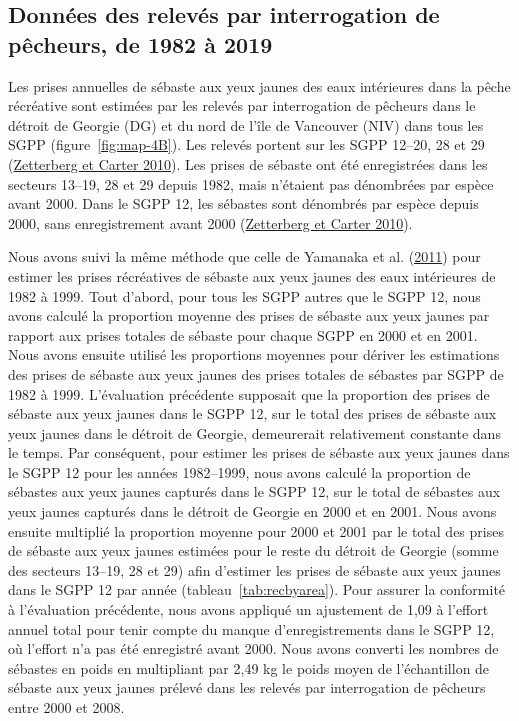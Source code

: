 \documentclass[french,11pt]{book}
\begin{document}
\hypertarget{sec:creel-catch-data}{%
\subsection{Données des relevés par interrogation de pêcheurs, de 1982 à 2019}\label{sec:creel-catch-data}}

Les prises annuelles de sébaste aux yeux jaunes des eaux intérieures dans la pêche récréative sont estimées par les relevés par interrogation de pêcheurs dans le détroit de Georgie (DG) et du nord de l'île de Vancouver (NIV) dans tous les SGPP (figure~\ref{fig:map-4B}). Les relevés portent sur les SGPP 12--20, 28 et 29 (\protect\hyperlink{ref-zetterberg2010}{Zetterberg et Carter 2010}). Les prises de sébaste ont été enregistrées dans les secteurs 13--19, 28 et 29 depuis 1982, mais n'étaient pas dénombrées par espèce avant 2000. Dans le SGPP 12, les sébastes sont dénombrés par espèce depuis 2000, sans enregistrement avant 2000 (\protect\hyperlink{ref-zetterberg2010}{Zetterberg et Carter 2010}).

Nous avons suivi la même méthode que celle de Yamanaka et al. (\protect\hyperlink{ref-yamanaka2011}{2011}) pour estimer les prises récréatives de sébaste aux yeux jaunes des eaux intérieures de 1982 à 1999. Tout d'abord, pour tous les SGPP autres que le SGPP 12, nous avons calculé la proportion moyenne des prises de sébaste aux yeux jaunes par rapport aux prises totales de sébaste pour chaque SGPP en 2000 et en 2001. Nous avons ensuite utilisé les proportions moyennes pour dériver les estimations des prises de sébaste aux yeux jaunes des prises totales de sébastes par SGPP de 1982 à 1999. L'évaluation précédente supposait que la proportion des prises de sébaste aux yeux jaunes dans le SGPP 12, sur le total des prises de sébaste aux yeux jaunes dans le détroit de Georgie, demeurerait relativement constante dans le temps. Par conséquent, pour estimer les prises de sébaste aux yeux jaunes dans le SGPP 12 pour les années 1982--1999, nous avons calculé la proportion de sébastes aux yeux jaunes capturés dans le SGPP 12, sur le total de sébastes aux yeux jaunes capturés dans le détroit de Georgie en 2000 et en 2001. Nous avons ensuite multiplié la proportion moyenne pour 2000 et 2001 par le total des prises de sébaste aux yeux jaunes estimées pour le reste du détroit de Georgie (somme des secteurs 13--19, 28 et 29) afin d'estimer les prises de sébaste aux yeux jaunes dans le SGPP 12 par année (tableau~\ref{tab:recbyarea}). Pour assurer la conformité à l'évaluation précédente, nous avons appliqué un ajustement de 1,09 à l'effort annuel total pour tenir compte du manque d'enregistrements dans le SGPP 12, où l'effort n'a pas été enregistré avant 2000. Nous avons converti les nombres de sébastes en poids en multipliant par 2,49 kg le poids moyen de l'échantillon de sébaste aux yeux jaunes prélevé dans les relevés par interrogation de pêcheurs entre 2000 et 2008.
\end{document}
